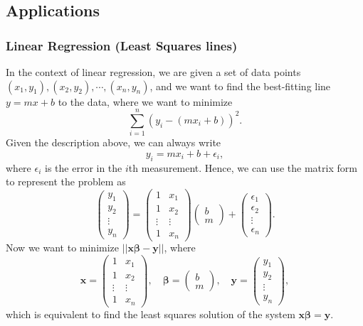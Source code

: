 \documentclass[10pt, a4paper]{article}
\newcommand{\vt}[1]{\mathbf{#1}}
\begin{document}
\subsection{Applications}
\subsubsection*{Linear Regression (Least Squares lines)}
\indent In the context of linear regression, we are given a set of data points $(x_1, y_1), (x_2, y_2), \cdots, (x_n, y_n)$, and we want to find the best-fitting line $y = mx + b$ to the data, where we want to minimize \[
\sum_{i=1}^{n}(y_i - (mx_i + b))^2. 
\]
Given the description above, we can always write $$y_i=mx_i+b+\epsilon_i,$$ where $\epsilon_i$ is the error in the $i$th measurement. Hence, we can use the matrix form to represent the problem as\[
\begin{pmatrix}
    y_1\\y_2\\\vdots\\y_n
\end{pmatrix}=\begin{pmatrix}
    1&x_1\\1&x_2\\\vdots&\vdots\\1&x_n
\end{pmatrix}\begin{pmatrix}
    b\\m
\end{pmatrix}+\begin{pmatrix}
    \epsilon_1\\\epsilon_2\\\vdots\\\epsilon_n
\end{pmatrix}.
\]
Now we want to minimize $||\vt{x}\vt{\beta}-\vt{y}||$, where\[
\vt{x}=\begin{pmatrix}
    1&x_1\\1&x_2\\\vdots&\vdots\\1&x_n
\end{pmatrix}, \quad \vt{\beta}=\begin{pmatrix}
    b\\m
\end{pmatrix}, \quad \vt{y}=\begin{pmatrix}
    y_1\\y_2\\\vdots\\y_n
\end{pmatrix},
\]
which is equivalent to find the least squares solution of the system $\vt{x}\vt{\beta}=\vt{y}$.
\end{document}
